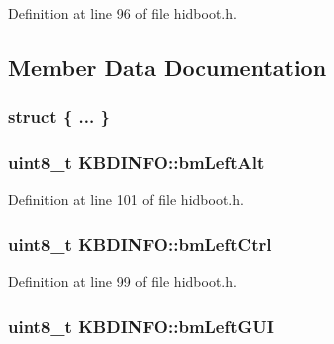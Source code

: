 \-Definition at line 96 of file hidboot.\-h.



\subsection{\-Member \-Data \-Documentation}
\hypertarget{struct_k_b_d_i_n_f_o_a15b983d1e9d55f71fc3e2ee5fd36fd2a}{\subsubsection[{"@12}]{\setlength{\rightskip}{0pt plus 5cm}struct \{ ... \} }}\label{struct_k_b_d_i_n_f_o_a15b983d1e9d55f71fc3e2ee5fd36fd2a}
\hypertarget{struct_k_b_d_i_n_f_o_a7e0966433308d3ef40434a7352b4e6f1}{
\subsubsection[{bm\-Left\-Alt}]{\setlength{\rightskip}{0pt plus 5cm}uint8\-\_\-t {\bf \-K\-B\-D\-I\-N\-F\-O\-::bm\-Left\-Alt}}}\label{struct_k_b_d_i_n_f_o_a7e0966433308d3ef40434a7352b4e6f1}


\-Definition at line 101 of file hidboot.\-h.

\hypertarget{struct_k_b_d_i_n_f_o_a08fcf2c3356d92c48da5e0df455685a7}{
\subsubsection[{bm\-Left\-Ctrl}]{\setlength{\rightskip}{0pt plus 5cm}uint8\-\_\-t {\bf \-K\-B\-D\-I\-N\-F\-O\-::bm\-Left\-Ctrl}}}\label{struct_k_b_d_i_n_f_o_a08fcf2c3356d92c48da5e0df455685a7}


\-Definition at line 99 of file hidboot.\-h.

\hypertarget{struct_k_b_d_i_n_f_o_a395dd36b5d26b2fa19eca4216710ea83}{
\subsubsection[{bm\-Left\-G\-U\-I}]{\setlength{\rightskip}{0pt plus 5cm}uint8\-\_\-t {\bf \-K\-B\-D\-I\-N\-F\-O\-::bm\-Left\-G\-U\-I}}}\label{struct_k_b_d_i_n_f_o_a395dd36b5d26b2fa19eca4216710ea83}


